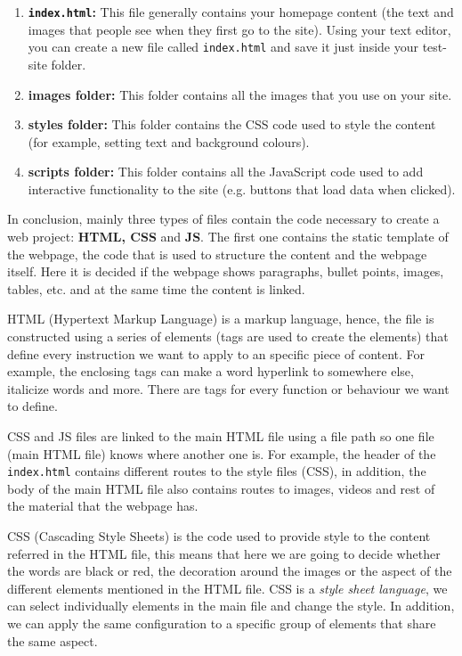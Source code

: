 \begin{enumerate}[nosep]
    \item \textbf{\texttt{index.html}:} This file generally contains your homepage content (the text and images that people see when they first go to the site). Using your text editor, you can create a new file called \texttt{index.html} and save it just inside your test-site folder.
    \item \textbf{images folder:} This folder contains all the images that you use on your site.
    \item \textbf{styles folder:} This folder contains the CSS code used to style the content (for example, setting text and background colours).
    \item \textbf{scripts folder:} This folder contains all the JavaScript code used to add interactive functionality to the site (e.g. buttons that load data when clicked).    
\end{enumerate}

In conclusion, mainly three types of files contain the code necessary to create a web project: \textbf{HTML, CSS} and \textbf{JS}. The first one contains the static template of the webpage, the code that is used to structure the content and the webpage itself. Here it is decided if the webpage shows paragraphs, bullet points, images, tables, etc. and at the same time the content is linked. 

HTML (Hypertext Markup Language) is a markup language, hence, the file is constructed using a series of elements (tags are used to create the elements) that define every instruction we want to apply to an specific piece of content. For example, the enclosing tags can make a word hyperlink to somewhere else, italicize words and more. There are tags for every function or behaviour we want to define.

CSS and JS files are linked to the main HTML file using a file path so one file (main HTML file) knows where another one is. For example, the header of the \texttt{index.html} contains different routes to the style files (CSS), in addition, the body of the main HTML file also contains routes to images, videos and rest of the material that the webpage has. 

CSS (Cascading Style Sheets) is the code used to provide style to the content referred in the HTML file, this means that here we are going to decide whether the words are black or red, the decoration around the images or the aspect of the different elements mentioned in the HTML file. CSS is a \textit{style sheet language}, we can select individually elements in the main file and change the style. In addition, we can apply the same configuration to a specific group of elements that share the same aspect. 

